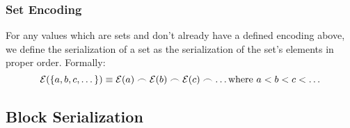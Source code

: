 
\subsubsection{Set Encoding}
For any values which are sets and don't already have a defined encoding above, we define the serialization of a set as the serialization of the set's elements in proper order. Formally:
\begin{equation}
  \mathcal{E}(\{a, b, c, \dots\}) \equiv \mathcal{E}(a) \frown \mathcal{E}(b) \frown \mathcal{E}(c) \frown \dots \text{where } a < b < c < \dots
\end{equation}

\subsection{Block Serialization}

